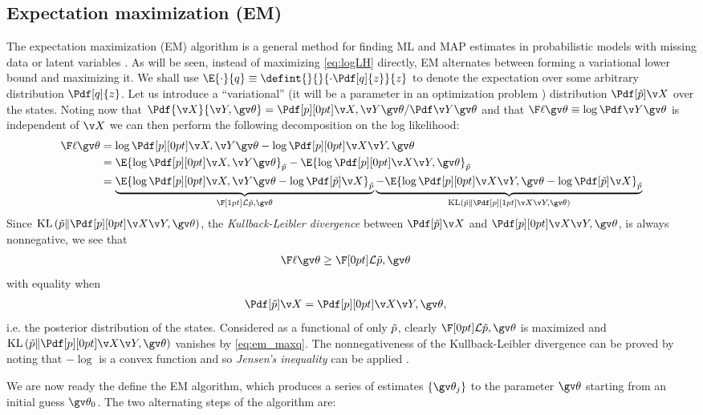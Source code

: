 \subsection{Expectation maximization (EM)}%

The expectation maximization (EM) algorithm \parencite{Dempster1977} is a general
method for finding ML and MAP estimates in probabilistic models with missing data or
latent variables \parencite{Bishop2006,barber2012bayesian}. As will be seen, instead of maximizing
\eqref{eq:logLH} directly, EM alternates between forming a variational lower bound and maximizing it.
We shall use $\E{\cdot}{q}\equiv\defint{}{}{\cdot \Pdf[q]{z}}{z}$ to denote the expectation
over some arbitrary distribution $\Pdf[q]{z}$.
Let us introduce a ``variational'' (it will be a parameter in an optimization problem \parencite{barber2012bayesian}) 
distribution $\tPX$ over the states. 
Noting now that $\Pdf{\X}{\Y,\Th}=\cLH/\LH$ and that $\lLH\equiv\log\LH$ is independent of $\X$ we can then perform the
following decomposition on the log likelihood:
\begin{align}
	\lLH &= \log\cLH - \log\post \nonumber\\
	&= \E{\log\cLH}_{\tP} - \E{\log\post}_{\tP} \nonumber\\
	&= \underbrace{\E{\log\cLH-\log\tPX}_{\tP}}_{\LB[1pt]{\tP,\Th}}
	\underbrace{-\E{\log\post-\log\tPX}_{\tP}}_{\KL{\tP}{\post[1pt]}}
	\label{eq:lLH_decomp}
\end{align}
Since $\KL{\tP}{\post}$, the \emph{Kullback-Leibler divergence} between $\tPX$ and $\post$, is always nonnegative,
we see that 
\begin{align}
	\lLH&\geq \LB{\tP,\Th} \label{eq:em_lh_lb}
\end{align}
with equality when 
\begin{align}
	\tPX &= \post, \label{eq:em_maxq}
\end{align}
i.e. the posterior distribution of the states. Considered as a functional
of only $\tilde{p}$, clearly $\LB{\tP,\Th}$ is maximized
and $\KL{\tP}{\post}$ vanishes by \eqref{eq:em_maxq}. 
The nonnegativeness of the Kullback-Leibler divergence can be proved by
noting that $-\log$ is a convex function and so \emph{Jensen's inequality}
can be applied \parencite{Bishop2006}.

We are now ready the define the EM algorithm, which produces
a series of estimates $\{\Th_j\}$ to the parameter $\Th$
starting from an initial guess $\Th_0$. The two alternating
steps of the algorithm are:

